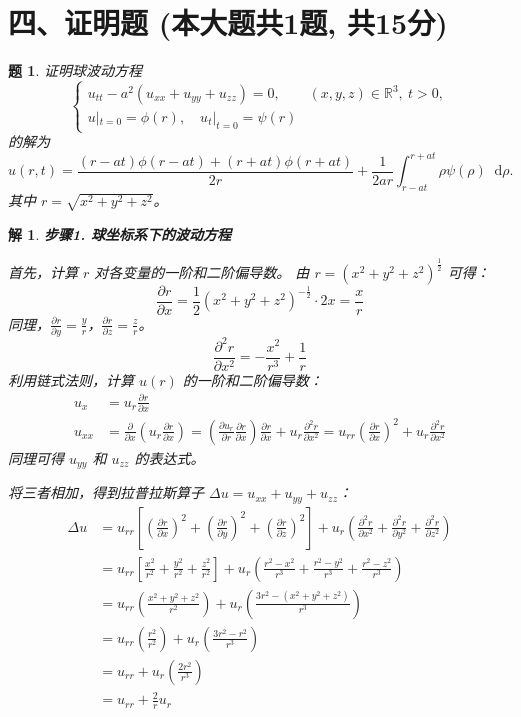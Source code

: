 \documentclass[12pt,a4paper]{article}
\newcommand{\diff}{\mathop{}\!\mathrm{d}}  %
\newcommand{\R}{\mathbb{R}}                %
\newtheorem{problem}{题}
\newtheorem*{solution}{解}
\begin{document}
	\section*{四、证明题 (本大题共1题, 共15分)}
	\begin{problem}
		证明球波动方程
		\[
		\begin{cases}
			u_{tt} - a^2 (u_{xx} + u_{yy} + u_{zz}) = 0, & (x, y, z) \in \R^3, \ t > 0, \\
			u|_{t=0} = \phi(r), \quad u_t|_{t=0} = \psi(r) &
		\end{cases}
		\]
		的解为
		\[
		u(r, t) = \frac{(r - at)\phi(r - at) + (r + at)\phi(r + at)}{2r} + \frac{1}{2ar}\int_{r-at}^{r+at} \rho \psi(\rho) \diff \rho.
		\]
		其中 $r = \sqrt{x^2+y^2+z^2}$。
	\end{problem}
	\hrulefill
	\begin{solution}
		\textbf{步骤1. 球坐标系下的波动方程}
		
		\noindent
	首先，计算 $r$ 对各变量的一阶和二阶偏导数。
	由 $r = (x^2+y^2+z^2)^{\frac{1}{2}}$ 可得：
	\[
	\frac{\partial r}{\partial x} = \frac{1}{2}(x^2+y^2+z^2)^{-\frac{1}{2}} \cdot 2x = \frac{x}{r}
	\]
	同理，$\frac{\partial r}{\partial y} = \frac{y}{r}$，$\frac{\partial r}{\partial z} = \frac{z}{r}$。
	\[
	\frac{\partial^2 r}{\partial x^2} = - \frac{x^2}{r^3} + \frac{1}{r}
	\]
	利用链式法则，计算 $u(r)$ 的一阶和二阶偏导数：
	\begin{align*}
		u_x &= u_r \frac{\partial r}{\partial x} \\[6pt]
		u_{xx} &= \frac{\partial}{\partial x}\left(u_r \frac{\partial r}{\partial x}\right) = \left(\frac{\partial u_r}{\partial r}\frac{\partial r}{\partial x}\right)\frac{\partial r}{\partial x} + u_r \frac{\partial^2 r}{\partial x^2} = u_{rr}\left(\frac{\partial r}{\partial x}\right)^2 + u_r \frac{\partial^2 r}{\partial x^2}
	\end{align*}
	同理可得 $u_{yy}$ 和 $u_{zz}$ 的表达式。
	
	将三者相加，得到拉普拉斯算子 $\Delta u = u_{xx} + u_{yy} + u_{zz}$：
	\begin{align*}
		\Delta u &= u_{rr} \left[ \left(\frac{\partial r}{\partial x}\right)^2 + \left(\frac{\partial r}{\partial y}\right)^2 + \left(\frac{\partial r}{\partial z}\right)^2 \right] + u_r \left( \frac{\partial^2 r}{\partial x^2} + \frac{\partial^2 r}{\partial y^2} + \frac{\partial^2 r}{\partial z^2} \right) \\[6pt]
		&= u_{rr} \left[ \frac{x^2}{r^2} + \frac{y^2}{r^2} + \frac{z^2}{r^2} \right] + u_r \left( \frac{r^2-x^2}{r^3} + \frac{r^2-y^2}{r^3} + \frac{r^2-z^2}{r^3} \right) \\[6pt]
		&= u_{rr} \left( \frac{x^2+y^2+z^2}{r^2} \right) + u_r \left( \frac{3r^2 - (x^2+y^2+z^2)}{r^3} \right) \\[6pt]
		&= u_{rr} \left( \frac{r^2}{r^2} \right) + u_r \left( \frac{3r^2 - r^2}{r^3} \right) \\
		&= u_{rr} + u_r \left( \frac{2r^2}{r^3} \right) \\[6pt]
		&= u_{rr} + \frac{2}{r} u_r
	\end{align*}
	

\end{solution}
\end{document}

